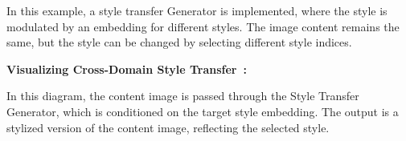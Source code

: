 In this example, a style transfer Generator is implemented, where the style is modulated by an embedding for different styles. The image content remains the same, but the style can be changed by selecting different style indices.

\textbf{Visualizing Cross-Domain Style Transfer~\cite{xu2019cross}:}

\begin{center}
\end{center}

In this diagram, the content image is passed through the Style Transfer Generator, which is conditioned on the target style embedding. The output is a stylized version of the content image, reflecting the selected style.
